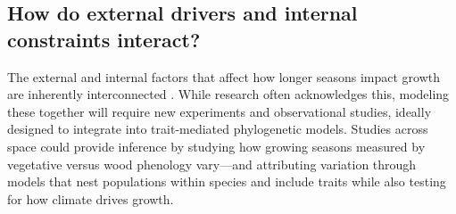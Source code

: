 \documentclass[11pt]{article}
\begin{document}

\subsection*{How do external drivers and internal constraints interact?} %


The external and internal factors that affect how longer seasons impact growth are inherently interconnected \citep{nobel1983biophysical}. While research often acknowledges this, modeling these together will require new experiments and observational studies, ideally designed to integrate into trait-mediated phylogenetic models. Studies across space could provide inference by studying how growing seasons measured by vegetative versus wood phenology vary---and attributing variation through models that nest populations within species and include traits while also testing for how climate drives growth.  
\end{document}
